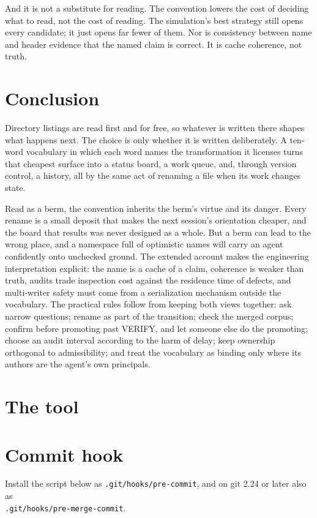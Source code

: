 \documentclass[11pt]{article}
\newcommand{\st}[1]{\textsf{#1}}
\begin{document}
And it is not a substitute for reading. The convention lowers the cost of deciding what to read, not the cost of reading. The simulation's best strategy still opens every candidate; it just opens far fewer of them. Nor is consistency between name and header evidence that the named claim is correct. It is cache coherence, not truth.

\section{Conclusion}

Directory listings are read first and for free, so whatever is written there shapes what happens next. The choice is only whether it is written deliberately. A ten-word vocabulary in which each word names the transformation it licenses turns that cheapest surface into a status board, a work queue, and, through version control, a history, all by the same act of renaming a file when its work changes state.

Read as a berm, the convention inherits the berm's virtue and its danger. Every rename is a small deposit that makes the next session's orientation cheaper, and the board that results was never designed as a whole. But a berm can lead to the wrong place, and a namespace full of optimistic names will carry an agent confidently onto unchecked ground. The extended account makes the engineering interpretation explicit: the name is a cache of a claim, coherence is weaker than truth, audits trade inspection cost against the residence time of defects, and multi-writer safety must come from a serialization mechanism outside the vocabulary. The practical rules follow from keeping both views together: ask narrow questions; rename as part of the transition; check the merged corpus; confirm before promoting past \st{VERIFY}, and let someone else do the promoting; choose an audit interval according to the harm of delay; keep ownership orthogonal to admissibility; and treat the vocabulary as binding only where its authors are the agent's own principals.

\appendix
\section{The tool}\label{app:tool}


\section{Commit hook}\label{app:hook}
Install the script below as \texttt{.git/hooks/pre-commit}, and on git 2.24 or later also as\\ \texttt{.git/hooks/pre-merge-commit}.

\end{document}
